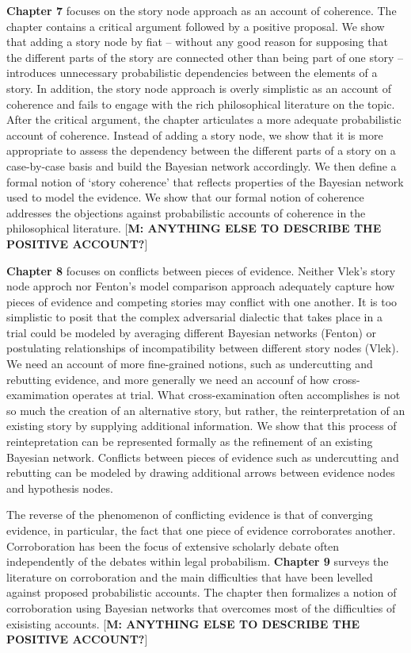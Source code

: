 \documentclass[10pt,dvipsnames,enabledeprecatedfontcommands]{scrartcl}
\begin{document}
\textbf{Chapter 7} focuses on the story node approach as an account of
coherence. The chapter contains a critical argument followed by a
positive proposal. We show that adding a story node by fiat -- without
any good reason for supposing that the different parts of the story are
connected other than being part of one story -- introduces unnecessary
probabilistic dependencies between the elements of a story. In addition,
the story node approach is overly simplistic as an account of coherence
and fails to engage with the rich philosophical literature on the topic.
After the critical argument, the chapter articulates a more adequate
probabilistic account of coherence. Instead of adding a story node, we
show that it is more appropriate to assess the dependency between the
different parts of a story on a case-by-case basis and build the
Bayesian network accordingly. We then define a formal notion of `story
coherence' that reflects properties of the Bayesian network used to
model the evidence. We show that our formal notion of coherence
addresses the objections against probabilistic accounts of coherence in
the philosophical literature.
{[}\textbf{M: ANYTHING ELSE TO DESCRIBE THE POSITIVE ACCOUNT?}{]}

\textbf{Chapter 8} focuses on conflicts between pieces of evidence.
Neither Vlek's story node approch nor Fenton's model comparison approach
adequately capture how pieces of evidence and competing stories may
conflict with one another. It is too simplistic to posit that the
complex adversarial dialectic that takes place in a trial could be
modeled by averaging different Bayesian networks (Fenton) or postulating
relationships of incompatibility between different story nodes (Vlek).
We need an account of more fine-grained notions, such as undercutting
and rebutting evidence, and more generally we need an accounf of how
cross-examimation operates at trial. What cross-examination often
accomplishes is not so much the creation of an alternative story, but
rather, the reinterpretation of an existing story by supplying
additional information. We show that this process of reintepretation can
be represented formally as the refinement of an existing Bayesian
network. Conflicts between pieces of evidence such as undercutting and
rebutting can be modeled by drawing additional arrows between evidence
nodes and hypothesis nodes.

The reverse of the phenomenon of conflicting evidence is that of
converging evidence, in particular, the fact that one piece of evidence
corroborates another. Corroboration has been the focus of extensive
scholarly debate often independently of the debates within legal
probabilism. \textbf{Chapter 9} surveys the literature on corroboration
and the main difficulties that have been levelled against proposed
probabilistic accounts. The chapter then formalizes a notion of
corroboration using Bayesian networks that overcomes most of the
difficulties of exisisting accounts.
{[}\textbf{M: ANYTHING ELSE TO DESCRIBE THE POSITIVE ACCOUNT?}{]}
\end{document}
